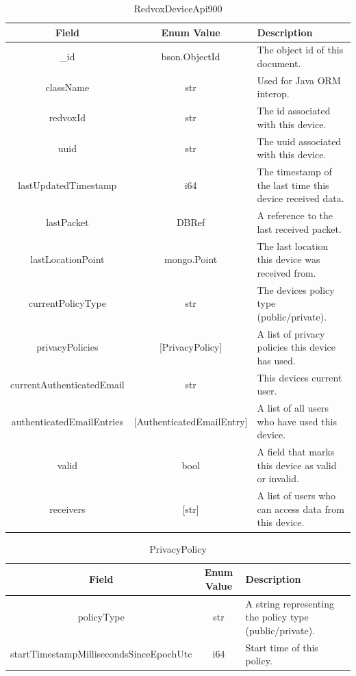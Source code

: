 \begin{table}[H]
	\centering
	\caption{RedvoxDeviceApi900}
	\begin{tabular}{|c|c| p{8cm} |}
		\hline
		Field & Enum Value & Description  \\
		\hline
		\_id & bson.ObjectId & The object id of this document. \\
		\hline
		className & str & Used for Java ORM interop. \\
		\hline
		redvoxId & str & The id associated with this device. \\
		\hline
		uuid & str & The uuid associated with this device. \\
		\hline
		lastUpdatedTimestamp & i64 & The timestamp of the last time this device received data. \\
		\hline
		lastPacket & DBRef & A reference to the last received packet. \\
		\hline
		lastLocationPoint & mongo.Point & The last location this device was received from. \\
		\hline
		currentPolicyType & str & The devices policy type (public/private). \\
		\hline
		privacyPolicies & [PrivacyPolicy] & A list of privacy policies this device has used. \\
		\hline
		currentAuthenticatedEmail & str & This devices current user. \\
		\hline
		authenticatedEmailEntries & [AuthenticatedEmailEntry] & A list of all users who have used this device. \\
		\hline
		valid & bool & A field that marks this device as valid or invalid. \\
		\hline
		receivers & [str] & A list of users who can access data from this device. \\
		\hline
	\end{tabular}
	\label{table:RedvoxDeviceApi900}
\end{table}

\begin{table}[H]
	\centering
	\caption{PrivacyPolicy}
	\begin{tabular}{|c|c| p{8cm} |}
		\hline
		Field & Enum Value & Description  \\
		\hline
		policyType & str & A string representing the policy type (public/private). \\
		\hline
		startTimestampMillisecondsSinceEpochUtc & i64 & Start time of this policy. \\
		\hline
	\end{tabular}
	\label{table:PrivacyPolicy}
\end{table}

